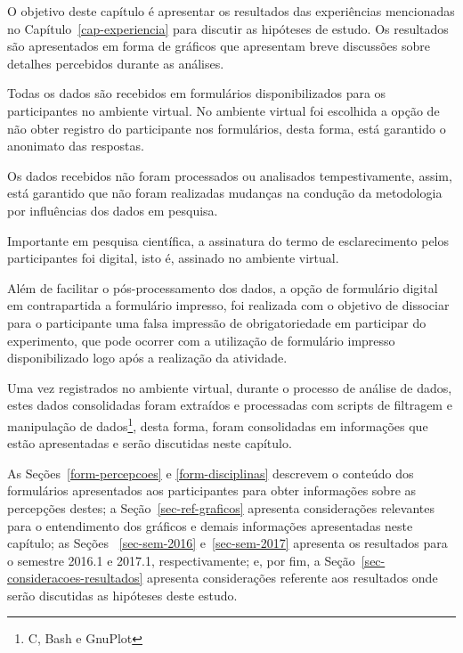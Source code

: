 \acresetall

O objetivo deste capítulo é apresentar os resultados das experiências
mencionadas no Capítulo~\ref{cap-experiencia} para discutir as
hipóteses de estudo.
Os resultados são apresentados em forma de gráficos que apresentam
breve discussões sobre detalhes percebidos durante as análises.

Todas os dados são recebidos em formulários
disponibilizados para os participantes no ambiente virtual.
No ambiente virtual foi escolhida a opção de não
obter registro do participante nos formulários, desta forma,
está garantido o anonimato das respostas.

Os dados recebidos não foram processados ou analisados
tempestivamente, assim, está garantido que não foram
realizadas mudanças na condução da metodologia
por influências dos dados em pesquisa.

Importante em pesquisa científica, a assinatura do termo
de esclarecimento pelos participantes foi digital, isto é, assinado
no ambiente virtual.

Além de facilitar o pós-processamento dos dados, a opção de
formulário digital em contrapartida a formulário impresso, foi
realizada com o objetivo de dissociar para o participante
uma falsa impressão de obrigatoriedade em participar do experimento,
que pode ocorrer com a utilização de formulário impresso disponibilizado
logo após a realização da atividade.


Uma vez registrados no ambiente virtual, durante o processo de análise de dados,
estes dados consolidadas foram extraídos e processadas com scripts de filtragem
e manipulação de dados\footnote{C, Bash e GnuPlot}, desta forma, foram consolidadas em informações que estão
apresentadas e serão discutidas neste capítulo.

As Seções~\ref{form-percepcoes} e \ref{form-disciplinas} descrevem
o conteúdo dos formulários apresentados aos participantes para obter
informações sobre as percepções destes;
a Seção~\ref{sec-ref-graficos} apresenta considerações relevantes para o
entendimento dos gráficos e demais informações apresentadas neste capítulo;
as Seções ~\ref{sec-sem-2016} e~\ref{sec-sem-2017}
apresenta os resultados para o semestre 2016.1 e 2017.1, respectivamente;
e, por fim, a Seção~\ref{sec-consideracoes-resultados} apresenta
considerações referente aos resultados onde serão discutidas
as hipóteses deste estudo.

